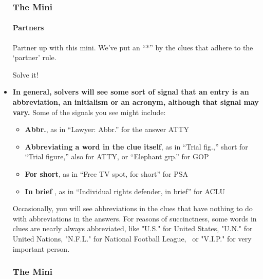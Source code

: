 \begin{itemize}
  \hypertarget{the-mini-7}{%
  \subsubsection{The Mini}\label{the-mini-7}}

  \href{https://www.nytimes.com/crosswords/game/special/partners}{}

  \hypertarget{partners}{%
  \paragraph{Partners}\label{partners}}

  Partner up with this mini. We've put an ``*'' by the clues that adhere
  to the `partner' rule.

  Solve it!
\item
  \textbf{In general, solvers will see some sort of signal that an entry
  is an abbreviation, an initialism or an acronym, although that signal
  may vary.} Some of the signals you see might include:

  \begin{itemize}
  \tightlist
  \item
    \textbf{Abbr.}, as in ``Lawyer: Abbr.'' for the answer ATTY
  \item
    \textbf{Abbreviating a word in the clue itself}, as in ``Trial
    fig.,'' short for ``Trial figure,'' also for ATTY, or ``Elephant
    grp.'' for GOP
  \item
    \textbf{For short}, as in ``Free TV spot, for short'' for PSA
  \item
    \textbf{In brief} , as in ``Individual rights defender, in brief''
    for ACLU
  \end{itemize}

  Occasionally, you will see abbreviations in the clues that have
  nothing to do with abbreviations in the answers. For reasons of
  succinctness, some words in clues are nearly always abbreviated, like
  "U.S." for United States, "U.N." for United Nations, "N.F.L." for
  National Football League, ~or "V.I.P." for very important person.

  \hypertarget{the-mini-8}{%
  \subsubsection{The Mini}\label{the-mini-8}}

  \href{https://www.nytimes.com/crosswords/game/special/abbreviations}{}

  \hypertarget{abbreviations}{%
}
\end{itemize}
